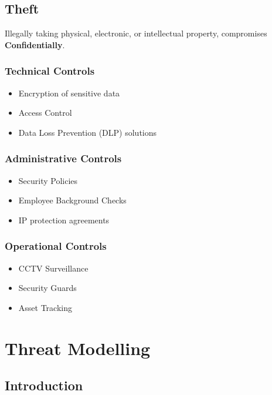 \documentclass[12pt letter]{report}
\begin{document}
\section{Theft}

Illegally taking physical, electronic, or intellectual property,
compromises \textbf{Confidentially}.

\subsection{Technical Controls}
\begin{itemize}
  \item Encryption of sensitive data
  \item Access Control
  \item Data Loss Prevention (DLP) solutions
\end{itemize}

\subsection{Administrative Controls}
\begin{itemize}
  \item Security Policies
  \item Employee Background Checks
  \item IP protection agreements
\end{itemize}

\subsection{Operational Controls}
\begin{itemize}
  \item CCTV Surveillance
  \item Security Guards
  \item Asset Tracking
\end{itemize}

\chapter{Threat Modelling}

\section{Introduction}

\end{document}
